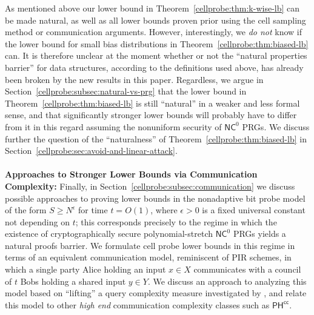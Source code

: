 As mentioned above our lower bound in Theorem~\ref{cellprobe:thm:k-wise-lb} can be made natural, as well as all lower bounds proven prior using the cell sampling method or communication arguments. However, interestingly, we \emph{do not} know if the lower bound for small bias distributions in Theorem~\ref{cellprobe:thm:biased-lb} can. 
It is therefore unclear at the moment whether or not the ``natural properties barrier'' for data structures, according to the definitions used above, has already been broken by the new results in this paper. 
Regardless, we argue in Section~\ref{cellprobe:subsec:natural-vs-prg} that the lower bound in Theorem~\ref{cellprobe:thm:biased-lb} is still ``natural'' in a weaker and less formal sense, and that significantly stronger lower bounds will probably have to differ from it in this regard assuming the nonuniform security of $\mathsf{NC}^0$ PRGs.
We discuss further the question of the ``naturalness'' of Theorem~\ref{cellprobe:thm:biased-lb} in Section~\ref{cellprobe:sec:avoid-and-linear-attack}.
~\\~\\
{\bf \noindent Approaches to Stronger Lower Bounds via Communication Complexity:}
Finally, in Section~\ref{cellprobe:subsec:communication} we discuss possible approaches to proving lower bounds in the nonadaptive bit probe model of the form $S \geq N^{\epsilon}$ for time $t=O(1)$, where $\epsilon>0$ is a fixed universal constant not depending on $t$; this corresponds precisely to the regime in which the existence of cryptographically secure polynomial-stretch $\mathsf{NC}^0$ PRGs yields a natural proofs barrier. We formulate cell probe lower bounds in this regime in terms of an equivalent communication model, reminiscent of PIR schemes, in which a single party Alice holding an input $x \in X$ communicates with a council of $t$ Bobs holding a shared input $y \in Y$. We discuss an approach to analyzing this model based on ``lifting'' a query complexity measure investigated by \cite{hrubes-rao,lecomte2022composition}, and relate this model to other \emph{high end} communication complexity classes such as $\mathsf{PH^{cc}}$.

